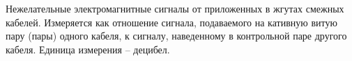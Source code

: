 Нежелательные электромагнитные сигналы от приложенных в жгутах
смежных кабелей. Измеряется как отношение сигнала, подаваемого
на кативную витую пару (пары) одного кабеля, к сигналу,
наведенному в контрольной паре другого кабеля. Единица
измерения -- децибел.